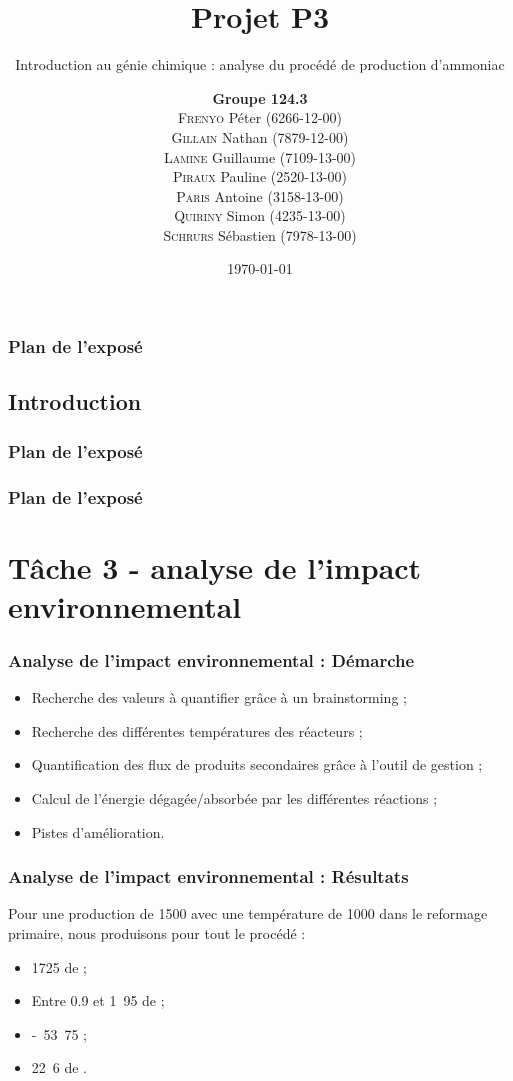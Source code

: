 \documentclass{beamer}
\title{Projet P3}
\subtitle{Introduction au génie chimique : analyse du procédé de production d'ammoniac}
\author{\textbf{Groupe 124.3}\\
\textsc{Frenyo} Péter (6266-12-00)\\
\textsc{Gillain} Nathan (7879-12-00)\\
\textsc{Lamine} Guillaume (7109-13-00)\\
\textsc{Piraux} Pauline (2520-13-00)\\
\textsc{Paris} Antoine (3158-13-00)\\
\textsc{Quiriny} Simon (4235-13-00)\\
\textsc{Schrurs} Sébastien (7978-13-00)}
\date{\today}
\begin{document}
 
 
	\begin{frame} 
		\titlepage 
	\end{frame} 
	
	\begin{frame}
		\frametitle{Plan de l'exposé}
		\tableofcontents
	\end{frame}
	
	\begin{frame}
		\section{Introduction}
		\frametitle{Plan de l'exposé}
		\tableofcontents[currentsubsection,sectionstyle=show/shaded,subsectionstyle=show/shaded/hide]
	\end{frame}
	
	\begin{frame}
		\frametitle{Plan de l'exposé}
		\section{Tâche 3 - analyse de l'impact environnemental}
		\tableofcontents[currentsubsection,sectionstyle=show/shaded,subsectionstyle=show/shaded/hide]
	\end{frame}
	
	\begin{frame}
	\frametitle{Analyse de l'impact environnemental : Démarche}
	\begin{itemize}
		\item Recherche des valeurs à quantifier grâce à un brainstorming ;
		\item Recherche des différentes températures des réacteurs ;
		\item Quantification des flux de produits secondaires grâce à l'outil de gestion ;
		\item Calcul de l'énergie dégagée/absorbée par les différentes réactions ;
		\item Pistes d'amélioration.
	\end{itemize}
	\end{frame}

	\begin{frame}
	\frametitle{Analyse de l'impact environnemental : Résultats}
	Pour une production de \unit{1500}{\ton\per\dday} avec une température 
	de \unit{1000}{\kelvin} dans le reformage primaire, nous 	produisons pour tout le procédé :
	\begin{itemize}
		\item \unit{1725}{\ton\per\dday} de \chemform{CO_2} ;
		\item Entre 0.9 et \unit{1.95}{\ton\per\dday} de \chemform{NO_x} ;
		\item \unit{-53.75}{\kilo\joule\per\dday} ;
		\item \unit{22.6}{\ton\per\dday} de \chemform{Ar}.
	\end{itemize}
	\end{frame}
\end{document}
